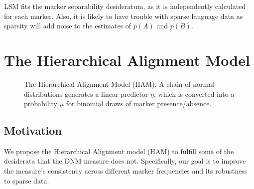 \documentclass{acm_proc_article-sp}
\begin{document}
LSM fits the marker separability desideratum, as it is independently calculated for each marker. Also, it is likely to have trouble with sparse language data as sparsity will add noise to the estimates of $p(A)$ and $p(B)$.





\section{The Hierarchical Alignment Model}

\begin{figure}
  \begin{center}
    
  \end{center}
  \caption{The Hierarchical Alignment Model (HAM). A chain of normal distributions generates a linear predictor $\eta$, which is converted into a probability $\mu$ for binomial draws of marker presence/absence.}\label{fig:model}
\end{figure}

\subsection{Motivation}
We propose the Hierarchical Alignment model (HAM) to fulfill some of the desiderata that the DNM measure does not.  Specifically, our goal is to improve the measure's consistency across different marker frequencies and its robustness to sparse data.  
\end{document}

